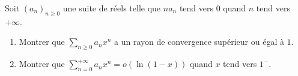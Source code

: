 \documentclass[a4paper,twoside,french,11pt]{VcCours}
\begin{document}

\begin{Exercice}[$\bigstar$]{} Soit $(a_n)_{n \geq 0}$ une suite de réels telle que $na_n$ tend vers $0$ quand $n$ tend vers $+ \infty$.
\begin{enumerate}
\item Montrer que $\sum_{n \geq 0} a_n x^n$ a un rayon de convergence supérieur ou égal à $1$.
\item Montrer que $\sum_{n=0}^{+ \infty} a_n x^n = o(\ln(1-x))$ quand $x$ tend vers $1^{-}$.
\end{enumerate}
\end{Exercice}
\end{document}
